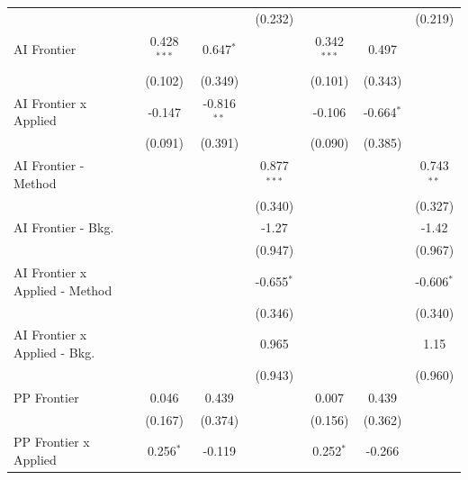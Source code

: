 \begin{tabular}{lcccccc}
                                  &                &               & (0.232)       &                &              & (0.219)\\   
   AI Frontier                    & 0.428$^{***}$  & 0.647$^{*}$   &               & 0.342$^{***}$  & 0.497        &   \\   
                                  & (0.102)        & (0.349)       &               & (0.101)        & (0.343)      &   \\   
   AI Frontier x Applied          & -0.147         & -0.816$^{**}$ &               & -0.106         & -0.664$^{*}$ &   \\   
                                  & (0.091)        & (0.391)       &               & (0.090)        & (0.385)      &   \\   
   AI Frontier - Method           &                &               & 0.877$^{***}$ &                &              & 0.743$^{**}$\\   
                                  &                &               & (0.340)       &                &              & (0.327)\\   
   AI Frontier - Bkg.             &                &               & -1.27         &                &              & -1.42\\   
                                  &                &               & (0.947)       &                &              & (0.967)\\   
   AI Frontier x Applied - Method &                &               & -0.655$^{*}$  &                &              & -0.606$^{*}$\\   
                                  &                &               & (0.346)       &                &              & (0.340)\\   
   AI Frontier x Applied - Bkg.   &                &               & 0.965         &                &              & 1.15\\   
                                  &                &               & (0.943)       &                &              & (0.960)\\   
   PP Frontier                    & 0.046          & 0.439         &               & 0.007          & 0.439        &   \\   
                                  & (0.167)        & (0.374)       &               & (0.156)        & (0.362)      &   \\   
   PP Frontier x Applied          & 0.256$^{*}$    & -0.119        &               & 0.252$^{*}$    & -0.266       &   \\   

\end{tabular}
